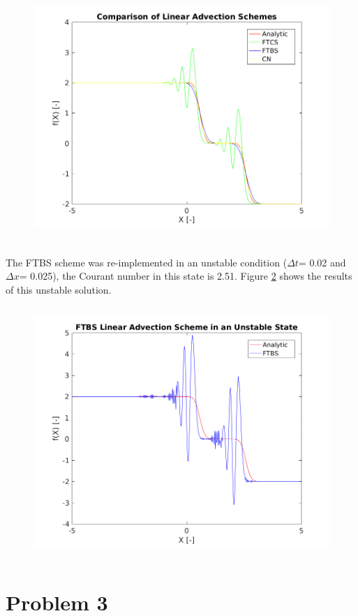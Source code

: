 \documentclass[12pt]{article}
\begin{document}
		\begin{figure}[H]
			\centering
			\includegraphics[height=3.75in]{ftcs_ftbs.png}
			\label{fig:ftcs_ftbs}
			\caption{}
		\end{figure}
		
	\noindent The FTBS scheme was re-implemented in an unstable condition ($\Delta t$= 0.02 and $\Delta x$= 0.025), the Courant number in this state is 2.51. Figure \ref{fig:ftbs_unstable} shows the results of this unstable solution.
	
	\begin{figure}[H]
		\centering
		\includegraphics[height=3.75in]{ftbs_unstable.png}
		\label{fig:ftbs_unstable}
		\caption{}
	\end{figure}
	
	\section{Problem 3}
	
\end{document}
